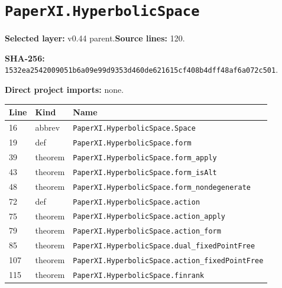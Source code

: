 \documentclass[10pt,oneside]{book}
\begin{document}
\section{\texorpdfstring{\nolinkurl{PaperXI.HyperbolicSpace}}{PaperXI.HyperbolicSpace}}\label{module:PaperXI.HyperbolicSpace}

\textbf{Selected layer:} v0.44 parent.\quad\textbf{Source lines:} 120.\par\textbf{SHA-256:} {\scriptsize\nolinkurl{1532ea2542009051b6a09e99d9353d460de621615cf408b4dff48af6a072c501}}.


\textbf{Direct project imports:} none.

\begin{longtable}{@{}p{}p{}p{}@{}}\toprule Line&Kind&Name\\\midrule\endhead

16&abbrev&\nolinkurl{PaperXI.HyperbolicSpace.Space}\\

19&def&\nolinkurl{PaperXI.HyperbolicSpace.form}\\

39&theorem&\nolinkurl{PaperXI.HyperbolicSpace.form_apply}\\

43&theorem&\nolinkurl{PaperXI.HyperbolicSpace.form_isAlt}\\

48&theorem&\nolinkurl{PaperXI.HyperbolicSpace.form_nondegenerate}\\

72&def&\nolinkurl{PaperXI.HyperbolicSpace.action}\\

75&theorem&\nolinkurl{PaperXI.HyperbolicSpace.action_apply}\\

79&theorem&\nolinkurl{PaperXI.HyperbolicSpace.action_form}\\

85&theorem&\nolinkurl{PaperXI.HyperbolicSpace.dual_fixedPointFree}\\

107&theorem&\nolinkurl{PaperXI.HyperbolicSpace.action_fixedPointFree}\\

115&theorem&\nolinkurl{PaperXI.HyperbolicSpace.finrank}\\

\bottomrule\end{longtable}
\end{document}
